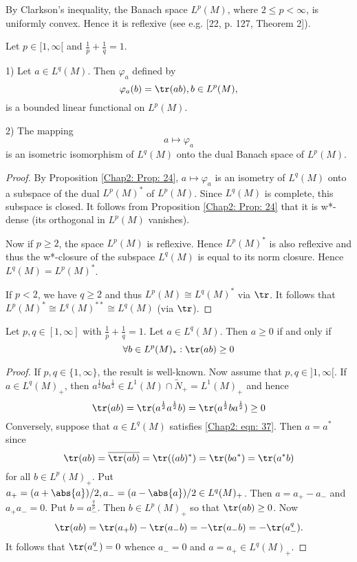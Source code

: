 By Clarkson's inequality, the Banach space $L^p(M)$, where $2\leq p<\infty$, is uniformly convex. Hence it is reflexive (see e.g. [22, p. 127, Theorem 2]).
\begin{theorem}
    Let $p\in [1,\infty[$ and $\frac{1}{p} + \frac{1}{q}=1$.\par
    1) Let $a\in L^q(M)$. Then $\varphi_a$ defined by
    \[
        \varphi_a(b)=\tr(ab),b\in L^p(M),
    \]
    is a bounded linear functional on $L^p(M)$.\par
    2) The mapping
    \[
        a\mapsto \varphi_a
    \]
    is an isometric isomorphism of $L^q(M)$ onto the dual Banach space of $L^p(M)$.
\end{theorem}
\begin{proof}
    By Proposition \ref{Chap2: Prop: 24}, $a\mapsto \varphi_a$ is an isometry of $L^q(M)$ onto a subspace of the dual $L^p(M)^*$ of $L^p(M)$. Since $L^q(M)$ is complete, this subspace is closed. It follows from Proposition \ref{Chap2: Prop: 24} that it is w*-dense (its orthogonal in $L^p(M)$ vanishes).\par
    Now if $p\geq 2$, the space $L^p(M)$ is reflexive. Hence $L^p(M)^*$ is also reflexive and thus the w*-closure of the subspace $L^q(M)$ is equal to its norm closure. Hence $L^q(M)=L^p(M)^*$.\par
    If $p<2$, we have $q\geq 2$ and thus $L^p(M)\cong L^q(M)^*$ via $\tr$. It follows that $L^p(M)^*\cong L^q(M)^{**}\cong L^q(M)$ (via $\tr$).
\end{proof}
\begin{proposition}\label{Chap2: Prop: 33}
    Let $p,q\in [1,\infty]$ with $\frac{1}{p}+\frac{1}{q}=1$. Let $a\in L^q(M)$. Then $a\geq 0$ if and only if
    \begin{equation}\label{Chap2: eqn: 37}
        \forall b\in L^p(M)_*:\tr(ab)\geq 0
    \end{equation}
\end{proposition}
\begin{proof}
    If $p,q\in \{1,\infty\}$, the result is well-known. Now assume that $p,q\in ]1,\infty[$. If $a\in L^q(M)_+$, then $a^\frac{1}{2}ba^\frac{1}{2}\in L^1(M)\cap \tilde{N}_+=L^1(M)_+$ and hence
    \[
        \tr(ab)=\tr(a^\frac{1}{2}a^\frac{1}{2}b)=\tr(a^\frac{1}{2}ba^\frac{1}{2})\geq 0
    \]
    Conversely, suppose that $a\in L^q(M)$ satisfies \eqref{Chap2: eqn: 37}. Then $a=a^*$ since
    \[
        \tr(ab)=\overline{\tr(ab)}=\tr((ab)^*)=\tr(ba^*)=\tr(a^*b)
    \]
    for all $b\in L^p(M)_+$. Put $a_+=(a+\abs{a})/2, a_-=(a-\abs{a})/2\in L^q(M)_+$. Then $a = a_+ - a_-$ and $a_+ a_- = 0$. Put $b=a_-^\frac{q}{p}$. Then $b\in L^p(M)_+$ so that $\tr(ab)\geq 0$. Now
    \[
        \tr(ab)=\tr(a_+b)-\tr(a_-b)=-\tr(a_-b)=-\tr(a_-^q).
    \]
    It follows that $\tr(a_-^q)=0$ whence $a_-= 0$ and $a = a_+\in L^q(M)_+$.
\end{proof}
